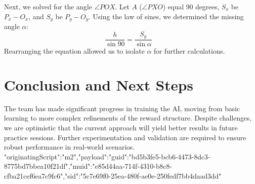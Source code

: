 Next, we solved for the angle $\angle POX$. Let $A$ ($\angle PXO$) equal 90 degrees, $S_x$ be $P_x - O_x$, and $S_y$ be $P_y - O_y$. Using the law of sines, we determined the missing angle $\alpha$:
\[
    \frac{h}{\sin{90}} = \frac{S_y}{\sin{\alpha}}
\]
Rearranging the equation allowed us to isolate $\alpha$ for further calculations.

\section*{Conclusion and Next Steps}
The team has made significant progress in training the AI, moving from basic learning to more complex refinements of the reward structure. Despite challenges, we are optimistic that the current approach will yield better results in future practice sessions. Further experimentation and validation are required to ensure robust performance in real-world scenarios.
{"originatingScript":"m2","payload":{"guid":"bd5b3fe5-bcb6-4473-8dc3-8775bd7bbea10f21df","muid":"e85d44aa-714f-4310-b8c8-cfba21cef6ea7c9fc6","sid":"5c7e69f0-25ea-480f-ae0e-250fedf7bb4daad3dd"}}